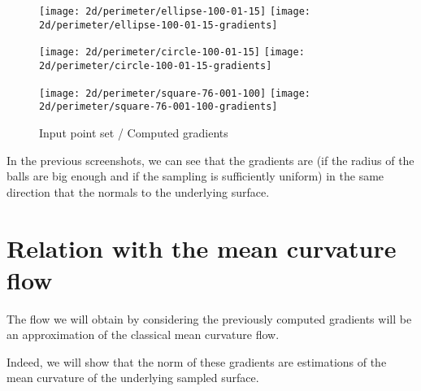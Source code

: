 \begin{figure}[H]
    \centering

    \begin{minipage}{0.8\linewidth}
        \centering
        \texttt{[image: 2d/perimeter/ellipse-100-01-15]}
        \texttt{[image: 2d/perimeter/ellipse-100-01-15-gradients]}
        \label{fig:gradients_perimeter_2d_ellipse}
    \end{minipage}

    \begin{minipage}{0.8\linewidth}
        \centering
        \texttt{[image: 2d/perimeter/circle-100-01-15]}
        \texttt{[image: 2d/perimeter/circle-100-01-15-gradients]}
        \label{fig:gradients_perimeter_2d_circle}
    \end{minipage}

    \begin{minipage}{0.8\linewidth}
        \centering
        \texttt{[image: 2d/perimeter/square-76-001-100]}
        \texttt{[image: 2d/perimeter/square-76-001-100-gradients]}
        \label{fig:gradients_perimeter_2d_square}
    \end{minipage}

    \caption{Input point set / Computed gradients}
    \label{fig:gradients_perimeter_2d}
\end{figure}

In the previous screenshots, we can see that the gradients are (if the radius of
the balls are big enough and if the sampling is sufficiently uniform) in the
same direction that the normals to the underlying surface.


\section{Relation with the mean curvature flow}

The flow we will obtain by considering the previously computed gradients will be
an approximation of the classical mean curvature flow.

Indeed, we will show that the norm of these gradients are estimations of the
mean curvature of the underlying sampled surface.


